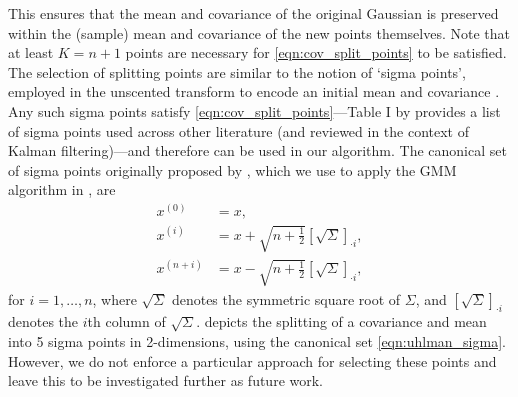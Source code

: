 This ensures that the mean and covariance of the original Gaussian is preserved within the (sample) mean and covariance of the new points themselves.
Note that at least \(K = n + 1\) points are necessary for \cref{eqn:cov_split_points} to be satisfied.
The selection of splitting points are similar to the notion of `sigma points', employed in the unscented transform to encode an initial mean and covariance \citep{Uhlmann_1995_DynamicMapBuilding,JulierEtAl_2000_NewMethodNonlinear}.
Any such sigma points satisfy \cref{eqn:cov_split_points}---Table I by \citet{MenegazEtAl_2015_SystematizationUnscentedKalman} provides a list of sigma points used across other literature (and reviewed in the context of Kalman filtering)---and therefore can be used in our algorithm.
The canonical set of sigma points originally proposed by \citet{Uhlmann_1995_DynamicMapBuilding}, which we use to apply the GMM algorithm in , are
\begin{subequations}\label{eqn:uhlman_sigma}
	\begin{align}
		x^{(0)}     & = x,                                                          \\
		x^{(i)}     & = x + \sqrt{n + \frac12}\left[\sqrt{\Sigma}\right]_{\cdot i}, \\
		x^{(n + i)} & = x - \sqrt{n + \frac12}\left[\sqrt{\Sigma}\right]_{\cdot i},
	\end{align}
\end{subequations}
for \(i = 1,\dotsc, n\), where \(\sqrt{\Sigma}\) denotes the symmetric square root of \(\Sigma\), and \(\left[\sqrt{\Sigma}\right]_{\cdot i}\) denotes the \(i\)th column of \(\sqrt{\Sigma}\).
 depicts the splitting of a covariance and mean into 5 sigma points in 2-dimensions, using the canonical set \cref{eqn:uhlman_sigma}.
However, we do not enforce a particular approach for selecting these points and leave this to be investigated further as future work.

